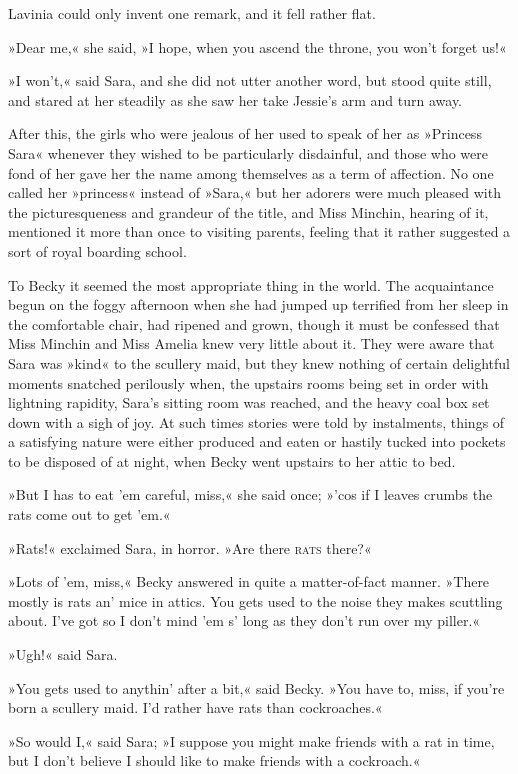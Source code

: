 Lavinia could only invent one remark, and it fell rather flat.

»Dear me,« she said, »I hope, when you ascend the throne, you won't forget us!«

»I won't,« said Sara, and she did not utter another word, but stood quite still, and stared at her steadily as she saw her take Jessie's arm and turn away.

After this, the girls who were jealous of her used to speak of her as »Princess Sara« whenever they wished to be particularly disdainful, and those who were fond of her gave her the name among themselves as a term of affection. No one called her »princess« instead of »Sara,« but her adorers were much pleased with the picturesqueness and grandeur of the title, and Miss Minchin, hearing of it, mentioned it more than once to visiting parents, feeling that it rather suggested a sort of royal boarding school.

To Becky it seemed the most appropriate thing in the world. The acquaintance begun on the foggy afternoon when she had jumped up terrified from her sleep in the comfortable chair, had ripened and grown, though it must be confessed that Miss Minchin and Miss Amelia knew very little about it. They were aware that Sara was »kind« to the scullery maid, but they knew nothing of certain delightful moments snatched perilously when, the upstairs rooms being set in order with lightning rapidity, Sara's sitting room was reached, and the heavy coal box set down with a sigh of joy. At such times stories were told by instalments, things of a satisfying nature were either produced and eaten or hastily tucked into pockets to be disposed of at night, when Becky went upstairs to her attic to bed.

»But I has to eat 'em careful, miss,« she said once; »'cos if I leaves crumbs the rats come out to get 'em.«

»Rats!« exclaimed Sara, in horror. »Are there \textsc{rats} there?«

»Lots of 'em, miss,« Becky answered in quite a matter-of-fact manner. »There mostly is rats an' mice in attics. You gets used to the noise they makes scuttling about. I've got so I don't mind 'em s' long as they don't run over my piller.«

»Ugh!« said Sara.

»You gets used to anythin' after a bit,« said Becky. »You have to, miss, if you're born a scullery maid. I'd rather have rats than cockroaches.«

»So would I,« said Sara; »I suppose you might make friends with a rat in time, but I don't believe I should like to make friends with a cockroach.«

